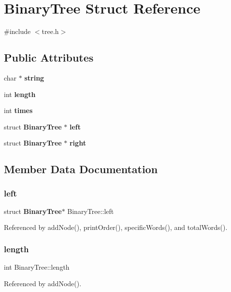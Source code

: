 \section{Binary\+Tree Struct Reference}
\label{structBinaryTree}


{\ttfamily \#include $<$tree.\+h$>$}

\subsection*{Public Attributes}
\begin{DoxyCompactItemize}
\item 
char $\ast$ \textbf{ string}
\item 
int \textbf{ length}
\item 
int \textbf{ times}
\item 
struct \textbf{ Binary\+Tree} $\ast$ \textbf{ left}
\item 
struct \textbf{ Binary\+Tree} $\ast$ \textbf{ right}
\end{DoxyCompactItemize}


\subsection{Member Data Documentation}
\mbox{\label{structBinaryTree_aa6f1f5d5b216ca02f431b5831057f5e6}} 
\subsubsection{left}
{\footnotesize\ttfamily struct \textbf{ Binary\+Tree}$\ast$ Binary\+Tree\+::left}



Referenced by add\+Node(), print\+Order(), specific\+Words(), and total\+Words().

\mbox{\label{structBinaryTree_acf16d101abb88ded7f6eb4f5ecb18cfb}} 
\subsubsection{length}
{\footnotesize\ttfamily int Binary\+Tree\+::length}



Referenced by add\+Node().

\mbox{\label{structBinaryTree_a0829e58e35e5be48055f2711a3d62d11}} 
